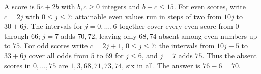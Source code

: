 A score is $5c+2b$ with $b,c\ge0$ integers and $b+c\le15$. For even scores, write $c=2j$ with $0\le j\le7$: attainable even values run in steps of two from $10j$ to $30+6j$. The intervals for $j=0,\ldots,6$ together cover every even score from $0$ through $66$; $j=7$ adds $70,72$, leaving only $68,74$ absent among even numbers up to $75$. For odd scores write $c=2j+1$, $0\le j\le7$: the intervals from $10j+5$ to $33+6j$ cover all odds from $5$ to $69$ for $j\le6$, and $j=7$ adds $75$. Thus the absent scores in $0,\ldots,75$ are $1,3,68,71,73,74$, six in all. The answer is $76-6=\boxed{70}$.
